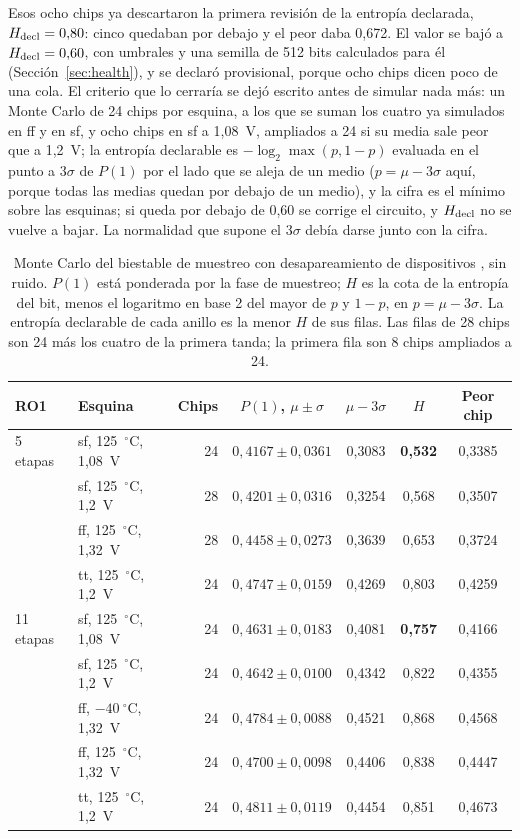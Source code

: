 Esos ocho chips ya descartaron la primera revisión de la entropía
declarada, $H_{\mathrm{decl}} = 0{,}80$: cinco quedaban por debajo y el peor daba
0,672. El valor se bajó a $H_{\mathrm{decl}} = 0{,}60$, con umbrales y una semilla de
512 bits calculados para él (Sección~\ref{sec:health}), y se declaró
provisional, porque ocho chips dicen poco de una cola. El criterio que lo
cerraría se dejó escrito antes de simular nada más: un Monte Carlo de 24
chips por esquina, a los que se suman los cuatro ya simulados en ff y en
sf, y ocho chips en sf a 1,08~V, ampliados a 24 si su media sale peor
que a 1,2~V; la entropía declarable es $-\log_2\max(p, 1-p)$
evaluada en el punto a $3\sigma$ de $P(1)$ por el lado que se aleja de un
medio ($p = \mu - 3\sigma$ aquí, porque todas las medias quedan por
debajo de un medio), y la cifra es el mínimo sobre
las esquinas; si queda por debajo de 0,60 se corrige el circuito, y
$H_{\mathrm{decl}}$ no se vuelve a bajar. La normalidad que supone el $3\sigma$
debía darse junto con la cifra.

\begin{table}[htbp]
\centering
\caption{Monte Carlo del biestable de muestreo con desapareamiento de
dispositivos \simu{}, sin ruido. $P(1)$ está ponderada por la fase de
muestreo; $H$ es la cota de la entropía del bit, menos el logaritmo en
base 2 del mayor de $p$ y $1-p$, en $p = \mu - 3\sigma$. La entropía
declarable de cada anillo es la menor $H$ de sus filas. Las filas de 28
chips son 24 más los cuatro de la primera tanda; la primera fila son 8
chips ampliados a 24.}
\label{tab:ff_mc}
\small
\begin{tabular}{@{}llrcccc@{}}
\toprule
RO1 & Esquina & Chips & $P(1)$, $\mu \pm \sigma$ & $\mu - 3\sigma$ & $H$ & Peor chip \\
\midrule
5 etapas  & sf, 125~$^\circ$C, 1,08~V & 24 & $0{,}4167 \pm 0{,}0361$ & 0,3083 & \textbf{0,532} & 0,3385 \\
          & sf, 125~$^\circ$C, 1,2~V  & 28 & $0{,}4201 \pm 0{,}0316$ & 0,3254 & 0,568 & 0,3507 \\
          & ff, 125~$^\circ$C, 1,32~V & 28 & $0{,}4458 \pm 0{,}0273$ & 0,3639 & 0,653 & 0,3724 \\
          & tt, 125~$^\circ$C, 1,2~V  & 24 & $0{,}4747 \pm 0{,}0159$ & 0,4269 & 0,803 & 0,4259 \\
\midrule
11 etapas & sf, 125~$^\circ$C, 1,08~V & 24 & $0{,}4631 \pm 0{,}0183$ & 0,4081 & \textbf{0,757} & 0,4166 \\
          & sf, 125~$^\circ$C, 1,2~V  & 24 & $0{,}4642 \pm 0{,}0100$ & 0,4342 & 0,822 & 0,4355 \\
          & ff, $-40~^\circ$C, 1,32~V & 24 & $0{,}4784 \pm 0{,}0088$ & 0,4521 & 0,868 & 0,4568 \\
          & ff, 125~$^\circ$C, 1,32~V & 24 & $0{,}4700 \pm 0{,}0098$ & 0,4406 & 0,838 & 0,4447 \\
          & tt, 125~$^\circ$C, 1,2~V  & 24 & $0{,}4811 \pm 0{,}0119$ & 0,4454 & 0,851 & 0,4673 \\
\bottomrule
\end{tabular}
\end{table}

